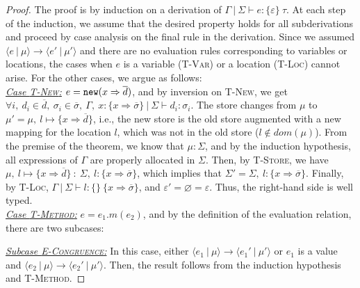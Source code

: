 \begin{proof} The proof is by induction on a derivation of \mbox{$\Gamma~|~\Sigma \vdash e : \{ \varepsilon \}~\tau$}. At each step of the induction, we assume that the desired property holds for all subderivations and proceed by case analysis on the final rule in the derivation. Since we assumed \mbox{$\langle e~|~\mu \rangle \longrightarrow \langle e'~|~\mu' \rangle$} and there are no evaluation rules corresponding to variables or locations, the cases when $e$ is a variable \mbox{(\textsc{T-Var})} or a location (\textsc{T-Loc}) cannot arise. For the other cases, we argue as follows:
\\

\noindent\underline{\textit{Case \textsc{T-New}:}}
\mbox{$e = \mathtt{new}(x \Rightarrow \overline{d})$}, and by inversion on \textsc{T-New}, we get\linebreak
\mbox{$\forall i,~d_i \in \overline{d},~\sigma_i \in \overline{\sigma},~\Gamma,~x : \{ x \Rightarrow \overline{\sigma} \}~|~\Sigma \vdash d_i : \sigma_i$}. The store changes from $\mu$ to\linebreak
\mbox{$\mu' = \mu,~l \mapsto \{ x \Rightarrow \overline{d} \}$}, i.e., the new store is the old store augmented with a new mapping for the location $l$, which was not in the old store ($l \not \in \mathit{dom}(\mu)$). From the premise of the theorem, we know that $\mu : \Sigma$, and by the induction hypothesis, all expressions of $\Gamma$ are properly allocated in $\Sigma$. Then, by \textsc{T-Store}, we have $\mu,~l \mapsto \{ x \Rightarrow \overline{d} \}~:~\Sigma,~l : \{ x \Rightarrow \overline{\sigma} \}$, which implies that $\Sigma' = \Sigma,~l : \{ x \Rightarrow \overline{\sigma} \}$. Finally, by \textsc{T-Loc}, $\Gamma~|~\Sigma \vdash l : \{\}~\{ x \Rightarrow \overline{\sigma} \}$, and $\varepsilon' = \varnothing = \varepsilon$. Thus, the right-hand side is well typed.
\\

\noindent\underline{\textit{Case \textsc{T-Method}:}}
$e = e_1.m(e_2)$, and by the definition of the evaluation relation, there are two subcases:

\underline{\textit{Subcase \textsc{E-Congruence}:}} In this case, either $\langle e_1~|~\mu \rangle \longrightarrow \langle e_1'~|~\mu' \rangle$ or $e_1$ is a value and \mbox{$\langle e_2~|~\mu \rangle \longrightarrow \langle e_2'~|~\mu' \rangle$}. Then, the result follows from the induction hypothesis and \mbox{\textsc{T-Method}}.


\end{proof}
